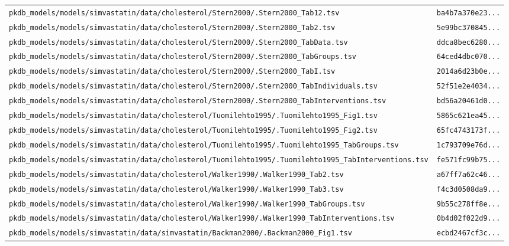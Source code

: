 \begin{longtable}{ll}
\texttt{pkdb\_models/models/simvastatin/data/cholesterol/Stern2000/.Stern2000\_Tab12.tsv} & \texttt{ba4b7a370e23...} \\
\texttt{pkdb\_models/models/simvastatin/data/cholesterol/Stern2000/.Stern2000\_Tab2.tsv} & \texttt{5e99bc370845...} \\
\texttt{pkdb\_models/models/simvastatin/data/cholesterol/Stern2000/.Stern2000\_TabData.tsv} & \texttt{ddca8bec6280...} \\
\texttt{pkdb\_models/models/simvastatin/data/cholesterol/Stern2000/.Stern2000\_TabGroups.tsv} & \texttt{64ced4dbc070...} \\
\texttt{pkdb\_models/models/simvastatin/data/cholesterol/Stern2000/.Stern2000\_TabI.tsv} & \texttt{2014a6d23b0e...} \\
\texttt{pkdb\_models/models/simvastatin/data/cholesterol/Stern2000/.Stern2000\_TabIndividuals.tsv} & \texttt{52f51e2e4034...} \\
\texttt{pkdb\_models/models/simvastatin/data/cholesterol/Stern2000/.Stern2000\_TabInterventions.tsv} & \texttt{bd56a20461d0...} \\
\texttt{pkdb\_models/models/simvastatin/data/cholesterol/Tuomilehto1995/.Tuomilehto1995\_Fig1.tsv} & \texttt{5865c621ea45...} \\
\texttt{pkdb\_models/models/simvastatin/data/cholesterol/Tuomilehto1995/.Tuomilehto1995\_Fig2.tsv} & \texttt{65fc4743173f...} \\
\texttt{pkdb\_models/models/simvastatin/data/cholesterol/Tuomilehto1995/.Tuomilehto1995\_TabGroups.tsv} & \texttt{1c793709e76d...} \\
\texttt{pkdb\_models/models/simvastatin/data/cholesterol/Tuomilehto1995/.Tuomilehto1995\_TabInterventions.tsv} & \texttt{fe571fc99b75...} \\
\texttt{pkdb\_models/models/simvastatin/data/cholesterol/Walker1990/.Walker1990\_Tab2.tsv} & \texttt{a67ff7a62c46...} \\
\texttt{pkdb\_models/models/simvastatin/data/cholesterol/Walker1990/.Walker1990\_Tab3.tsv} & \texttt{f4c3d0508da9...} \\
\texttt{pkdb\_models/models/simvastatin/data/cholesterol/Walker1990/.Walker1990\_TabGroups.tsv} & \texttt{9b55c278ff8e...} \\
\texttt{pkdb\_models/models/simvastatin/data/cholesterol/Walker1990/.Walker1990\_TabInterventions.tsv} & \texttt{0b4d02f022d9...} \\
\texttt{pkdb\_models/models/simvastatin/data/simvastatin/Backman2000/.Backman2000\_Fig1.tsv} & \texttt{ecbd2467cf3c...} \\

\end{longtable}
